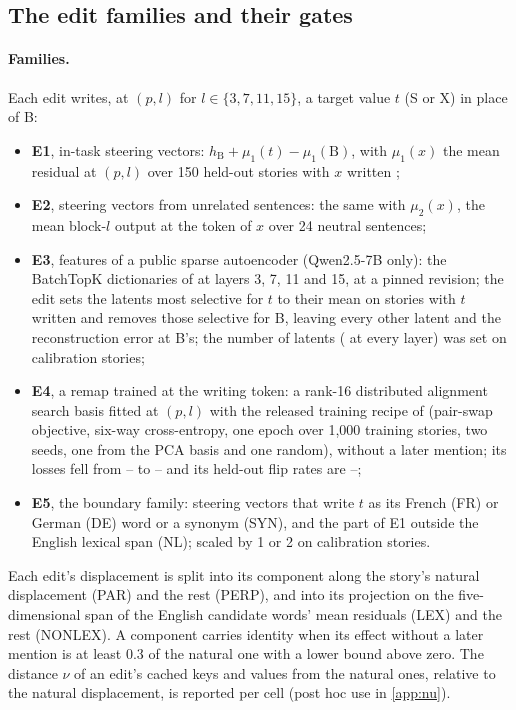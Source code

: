 \subsection{The edit families and their gates}\label{app:edits}

\paragraph{Families.} Each edit writes, at $(p, l)$ for $l \in \{3, 7, 11, 15\}$, a target value $t$ (S or X) in place of B:
\begin{itemize}\setlength\itemsep{0pt}
  \item \textbf{E1}, in-task steering vectors: $h_{\mathrm{B}} + \mu_1(t) - \mu_1(\mathrm{B})$, with $\mu_1(x)$ the mean residual at $(p, l)$ over 150 held-out stories with $x$ written \citep{turner2023actadd,panickssery2023caa};
  \item \textbf{E2}, steering vectors from unrelated sentences: the same with $\mu_2(x)$, the mean block-$l$ output at the token of $x$ over 24 neutral sentences;
  \item \textbf{E3}, features of a public sparse autoencoder (Qwen2.5-7B only): the BatchTopK dictionaries of \citet{andyrdt2025saes} \citep{bussmann2024batchtopk} at layers 3, 7, 11 and 15, at a pinned revision; the edit sets the latents most selective for $t$ to their mean on stories with $t$ written and removes those selective for B, leaving every other latent and the reconstruction error at B's; the number of latents (\JcGthreeKfThree{} at every layer) was set on calibration stories;
  \item \textbf{E4}, a remap trained at the writing token: a rank-16 distributed alignment search basis fitted at $(p, l)$ with the released training recipe of \citet{anonymous2026fitted} (pair-swap objective, six-way cross-entropy, one epoch over 1{,}000 training stories, two seeds, one from the PCA basis and one random), without a later mention; its losses fell from \JcDasLossFirstMin{}--\JcDasLossFirstMax{} to \JcDasLossLastMin{}--\JcDasLossLastMax{} and its held-out flip rates are \JcDasFlipMin{}--\JcDasFlipMax{};
  \item \textbf{E5}, the boundary family: steering vectors that write $t$ as its French (FR) or German (DE) word or a synonym (SYN), and the part of E1 outside the English lexical span (NL); scaled by 1 or 2 on calibration stories.
\end{itemize}
Each edit's displacement is split into its component along the story's natural displacement (PAR) and the rest (PERP), and into its projection on the five-dimensional span of the English candidate words' mean residuals (LEX) and the rest (NONLEX). A component carries identity when its effect without a later mention is at least 0.3 of the natural one with a lower bound above zero. The distance $\nu$ of an edit's cached keys and values from the natural ones, relative to the natural displacement, is reported per cell (post hoc use in \cref{app:nu}). %


